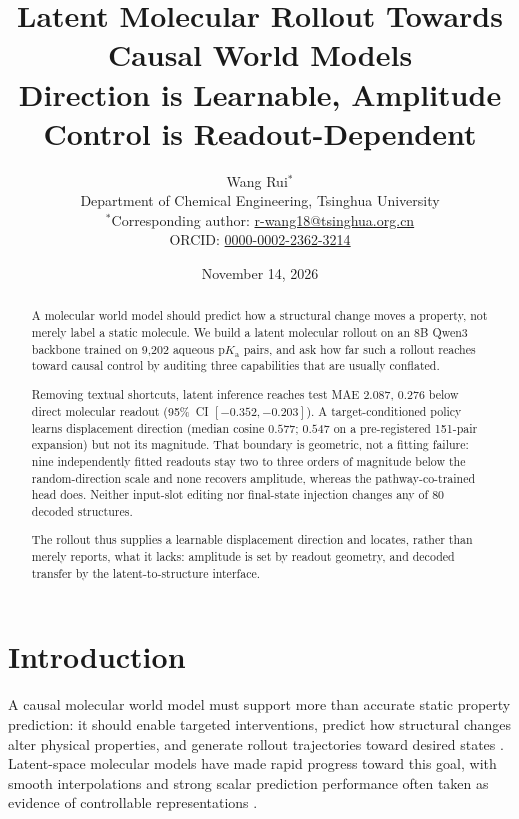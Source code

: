 \documentclass[11pt]{article}
\title{Latent Molecular Rollout Towards Causal World Models\\[0.4em]\large Direction is Learnable, Amplitude Control is Readout-Dependent}
\author{
  Wang Rui$^{*}$\\[0.3em]
  Department of Chemical Engineering, Tsinghua University\\[0.3em]
  $^{*}$Corresponding author: \href{mailto:r-wang18@tsinghua.org.cn}{r-wang18@tsinghua.org.cn}\\
  ORCID: \href{https://orcid.org/0000-0002-2362-3214}{0000-0002-2362-3214}
}
\date{November 14, 2026}
\newcommand{\pka}{\mathrm{p}K_{\mathrm a}}
\begin{document}
\maketitle

\begin{abstract}
A molecular world model should predict how a structural change moves a property, not merely label a static molecule. We build a latent molecular rollout on an 8B Qwen3 backbone trained on 9{,}202 aqueous $\pka$ pairs, and ask how far such a rollout reaches toward causal control by auditing three capabilities that are usually conflated.

Removing textual shortcuts, latent inference reaches test MAE $2.087$, $0.276$ below direct molecular readout (95\%~CI $[-0.352,-0.203]$). A target-conditioned policy learns displacement direction (median cosine $0.577$; $0.547$ on a pre-registered 151-pair expansion) but not its magnitude. That boundary is geometric, not a fitting failure: nine independently fitted readouts stay two to three orders of magnitude below the random-direction scale and none recovers amplitude, whereas the pathway-co-trained head does. Neither input-slot editing nor final-state injection changes any of 80 decoded structures.

The rollout thus supplies a learnable displacement direction and locates, rather than merely reports, what it lacks: amplitude is set by readout geometry, and decoded transfer by the latent-to-structure interface.
\end{abstract}

\section{Introduction}
\label{sec:introduction}

A causal molecular world model must support more than accurate static property prediction: it should enable targeted interventions, predict how structural changes alter physical properties, and generate rollout trajectories toward desired states \citep{Ha2018WorldModels,Scholkopf2021Causal}. Latent-space molecular models have made rapid progress toward this goal, with smooth interpolations and strong scalar prediction performance often taken as evidence of controllable representations \citep{Eckmann2022LIMO,Soares2025SMITED,Hao2025Coconut}.
\end{document}
